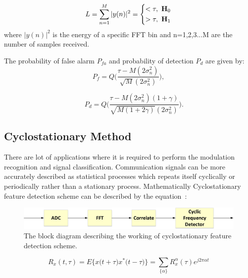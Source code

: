 \begin{equation}
\label{eq:2}
	L = \sum_{n=1}^{M}{|y(n)|^2} = 
	\left\{
	\begin{aligned}
		<\tau,~\mathbf{H}_0 \\
		>\tau,~\mathbf{H}_1		
	\end{aligned}
	\right.
\end{equation}
where $|y(n)|^2$ is the energy of a specific FFT bin and n=1,2,3...M are the number of samples received.

The probability of false alarm $P_{fa}$ and probability of detection $P_d$ are given by:
\begin{equation}
\label{eq:3}
P_f = Q\Bigg(\dfrac{\tau-M(2\sigma_n^2)}{\sqrt{M}(2\sigma_n^2)}\Bigg),
\end{equation}

\begin{equation}
\label{eq:4}
~~~~~~~P_d = Q\Bigg(\dfrac{\tau-M(2\sigma_n^2)(1+\gamma)}{\sqrt{M(1+2\gamma)}(2\sigma_n^2)}\Bigg).
\end{equation}

\subsection{Cyclostationary Method}

There are lot of applications where it is required to perform the modulation recognition and signal classification. Communication signals can be more accurately described as statistical processes which repeats itself cyclically or periodically rather than a stationary process. Mathematically Cyclostationary feature detection scheme can be described by the equation~\cite{bookhtn1}:

\begin{figure}[ht!]
	\centering
	\includegraphics[width=\textwidth,keepaspectratio]{images/Gill/figs/cyclostationary.eps}
    \caption{The block diagram describing the working of cyclostationary feature detection scheme.} 
\label{cycl}      
\end{figure}

\begin{equation}
\label{eq:cyclo}
R_x(t,\tau) = E\Bigg\{x\bigg(t+\tau \bigg)x^*\bigg(t-\tau \bigg)\Bigg\} = \sum_{\{\alpha\}} R_x^{\alpha}(\tau)e^{j2\pi\alpha t}
\end{equation}


